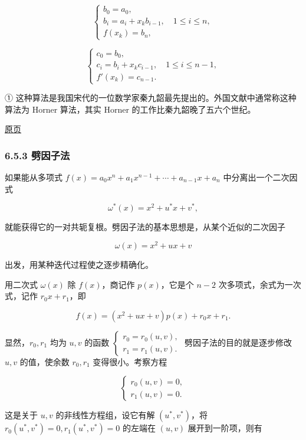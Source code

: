 \documentclass[
  10pt,
  fontset=fandol]{ctexart}
\begin{document}
\[
\begin{cases}
b_0=a_0,\\
b_i=a_i+x_kb_{i-1},\quad1\leqslant i\leqslant n,\\
f(x_k)=b_n,
\end{cases}
\tag{6.5.5}
\]

\[
\begin{cases}
c_0=b_0,\\
c_i=b_i+x_kc_{i-1},\quad1\leqslant i\leqslant n-1,\\
f'(x_k)=c_{n-1}.
\end{cases}
\tag{6.5.6}
\]

① 这种算法是我国宋代的一位数学家秦九韶最先提出的。外国文献中通常称这种算法为 Horner 算法，其实 Horner 的工作比秦九韶晚了五六个世纪。

\href{../../source-images/pdf-173.jpeg}{原页}

\subsubsection{6.5.3 劈因子法}\label{ux5288ux56e0ux5b50ux6cd5}

如果能从多项式 \(f(x)=a_0x^n+a_1x^{n-1}+\cdots+a_{n-1}x+a_n\) 中分离出一个二次因式

\[
\omega^*(x)=x^2+u^*x+v^*,
\]

就能获得它的一对共轭复根。劈因子法的基本思想是，从某个近似的二次因子

\[
\omega(x)=x^2+ux+v
\]

出发，用某种迭代过程使之逐步精确化。

用二次式 \(\omega(x)\) 除 \(f(x)\)，商记作 \(p(x)\)，它是个 \(n-2\) 次多项式，余式为一次式，记作 \(r_0x+r_1\)，即

\[
f(x)=(x^2+ux+v)p(x)+r_0x+r_1.
\tag{6.5.7}
\]

显然，\(r_0,r_1\) 均为 \(u,v\) 的函数 \(\begin{cases}r_0=r_0(u,v),\\r_1=r_1(u,v).\end{cases}\) 劈因子法的目的就是逐步修改 \(u,v\) 的值，使余数 \(r_0,r_1\) 变得很小。考察方程

\[
\begin{cases}
r_0(u,v)=0,\\
r_1(u,v)=0.
\end{cases}
\tag{6.5.8}
\]

这是关于 \(u,v\) 的非线性方程组，设它有解 \((u^*,v^*)\)，将 \(r_0(u^*,v^*)=0,r_1(u^*,v^*)=0\) 的左端在 \((u,v)\) 展开到一阶项，则有
\end{document}
